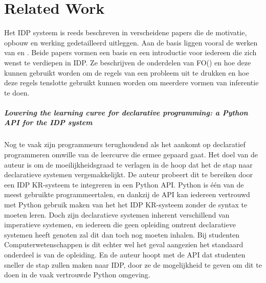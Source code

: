 \chapter{Related Work}
\label{cha:relatedwork}

Het IDP systeem is reeds beschreven in verscheidene papers die de motivatie, opbouw en werking gedetailleerd uitleggen. Aan de basis liggen vooral de werken van \citep{de2014predicate} en \citep{de2014separating}. Beide papers vormen een basis en een introductie voor iedereen die zich wenst te verdiepen in IDP. Ze beschrijven de onderdelen van FO(\textperiodcentered) en hoe deze kunnen gebruikt worden om de regels van een probleem uit te drukken en hoe deze regels tenslotte gebruikt kunnen worden om meerdere vormen van inferentie te doen. 

\paragraph{Lowering the learning curve for declarative programming: a Python API for the IDP system \cite{vennekens2015lowering}}
Nog te vaak zijn programmeurs terughoudend als het aankomt op declaratief programmeren omwille van de leercurve die ermee gepaard gaat. Het doel van de auteur is om de moeilijkheidsgraad te verlagen in de hoop dat het de stap naar declaratieve systemen vergemakkelijkt. De auteur probeert dit te bereiken door een IDP KR-systeem te integreren in een Python API. Python is \'{e}\'{e}n van de meest gebruikte programmeertalen, en dankzij de API kan iedereen vertrouwd met Python gebruik maken van het het IDP KR-systeem zonder de syntax te moeten leren. Doch zijn declaratieve systemen inherent verschillend van imperatieve systemen, en iedereen die geen opleiding omtrent declaratieve systemen heeft genoten zal dit dan toch nog moeten inhalen. Bij studenten Computerwetenschappen is dit echter wel het geval aangezien het standaard onderdeel is van de opleiding. En de auteur hoopt met de API dat studenten sneller de stap zullen maken naar IDP, door ze de mogelijkheid te geven om dit te doen in de vaak vertrouwde Python omgeving.

